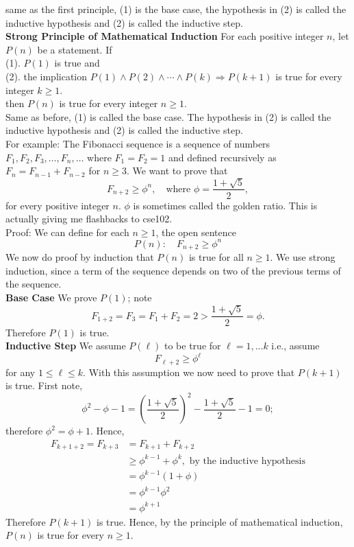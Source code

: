 \documentclass{article}
\begin{document}
same as the first principle, (1) is the base case, the hypothesis in (2) is called the inductive hypothesis and (2) is called the inductive step.\\
\textbf{Strong Principle of Mathematical Induction} For each positive integer \(n\), let \(P(n)\) be a statement. If\\
(1). \(P(1)\) is true and \\
(2). the implication $P(1)\land P(2) \land \cdots \land P(k) \Rightarrow P(k+1)$ is true for every integer \(k \geq 1\). \\
then \(P(n)\) is true for every integer \(n \geq 1\).\\
Same as before, (1) is called the base case. The hypothesis in (2) is called the inductive hypothesis and (2) is called the inductive step.\\
For example: The Fibonacci sequence is a sequence of numbers $F_1,F_2,F_3,\ldots,F_n,\ldots$ where \(F_1 = F_2 = 1\) and defined recursively as \(F_n = F_{n-1} + F_{n-2}\) for \(n \geq 3\). We want to prove that \[F_{n+2} \geq \phi^n,\quad \text{where }\phi = \frac{1+\sqrt{5}}{2},\]
for every positive integer \(n\). \(\phi\) is sometimes called the golden ratio. This is actually giving me flashbacks to cse102.\\
Proof: We can define for each \(n \geq 1\), the open sentence 
\[P(n):\quad F_{n+2} \geq \phi^n\]
We now do proof by induction that \(P(n)\) is true for all \(n \geq 1\). We use strong induction, since a term of the sequence depends on two of the previous terms of the sequence.\\
\textbf{Base Case} We prove \(P(1)\); note
\[F_{1+2} = F_3 = F_1 + F_2 = 2 > \frac{1+\sqrt{5}}{2} = \phi.\]
Therefore \(P(1)\) is true.\\
\textbf{Inductive Step} We assume \(P(\ell)\) to be true for \(\ell = 1,...k\) i.e., assume 
\[F_{\ell+2} \geq \phi^\ell\]
for any \(1 \leq \ell \leq k\). With this assumption we now need to prove that \(P(k+1)\) is true. First note,
\[\phi^2 - \phi - 1 = \left(\frac{1+\sqrt{5}}{2}\right)^2 - \frac{1+\sqrt{5}}{2} - 1 = 0;\]
therefore $\phi^2 = \phi + 1$. Hence,
\begin{align*} F_{k+1+2} = F_{k+3} &= F_{k+1} + F_{k+2}\\[0.5em] &\geq \phi^{k-1} + \phi^k,\text{ by the inductive hypothesis}\\[0.5em] &= \phi^{k-1}(1+\phi)\\[0.5em] &= \phi^{k-1}\phi^2\\[0.5em] &= \phi^{k+1} \end{align*}
Therefore \(P(k+1)\) is true. Hence, by the principle of mathematical induction, \(P(n)\) is true for every \(n \geq 1\).
\end{document}
